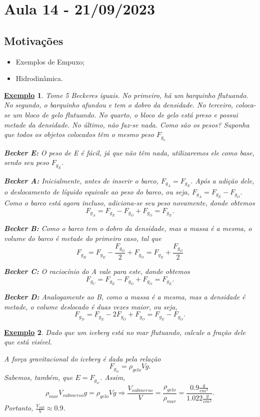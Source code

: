 \documentclass{article}
\newtheorem{example}{\underline{Exemplo}}
\begin{document}
\section{Aula 14 - 21/09/2023}
\subsection{Motivações}
\begin{itemize}
  \item Exemplos de Empuxo;
  \item Hidrodinâmica.
\end{itemize}
\begin{example}
  Tome 5 Beckeres iguais. No primeiro, há um barquinho flutuando. No segundo, o barquinho afundou e tem o dobro da densidade. No terceiro,
  coloca-se um bloco de gelo flutuando. No quarto, o bloco de gelo está preso e possui metade da densidade. No último, não faz-se nada. Como são os pesos?
  Suponha que todos os objetos colocados têm o mesmo peso \(F_{g_{o}}\)

  \textbf{Becker E:}
  O peso de E é fácil, já que não têm nada, utilizaremos ele como base, sendo seu peso \(F_{g_{E}}\).  

  \textbf{Becker A:}
  Inicialmente, antes de inserir o barco, \(F_{g_{A}} = F_{g_{E}}\). Após a adição dele, o deslocamento de líquido equivale ao peso do barco,
  ou seja, \(F_{g_{A}} = F_{g_{E}}-F_{g_{O}}.\) Como o barco está agora incluso, adiciona-se seu peso novamente, donde obtemos 
  \[
    F_{g_{A}} = F_{g_{E}} - F_{g_{O}} + F_{g_{O}} = F_{g_{E}}.
  \]

  \textbf{Becker B:}
  Como o barco tem o dobro da densidade, mas a massa é a mesma, o volume do barco é metade do primeiro caso, tal que 
  \[
    F_{g_{B}} = F_{g_{E}} - \frac{F_{g_{O}}}{2} + F_{g_{O}} = F_{g_{E}} + \frac{F_{g_{O}}}{2}
  \]

  \textbf{Becker C:}
  O raciocínio do A vale para este, donde obtemos 
  \[
    F_{g_{C}} = F_{g_{E}} - F_{g_{O}} + F_{g_{O}} = F_{g_{E}}.
  \]

  \textbf{Becker D:}
  Analogamente ao B, como a massa é a mesma, mas a densidade é metade, o volume deslocado é duas vezes maior, ou seja, 
  \[
    F_{g_{D}} = F_{g_{E}} - 2 F_{g_{O}} + F_{g_{O}} = F_{g_{E}} - F_{g_{O}}.
  \]
\end{example}
\begin{example}
  Dado que um iceberg está no mar flutuando, calcule a fração dele que está visível.

  A força gravitacional do iceberg é dada pela relação 
  \[
    F_{g_{ic}} = \rho_{gelo}Vg.
  \]
  Sabemos, também, que \(E = F_{g_{ic}}\). Assim, 
  \[
    \rho_{mar}V_{submerso}g = \rho_{gelo}Vg \Rightarrow \frac{V_{submerso}}{V} = \frac{\rho_{gelo}}{\rho_{mar}} = \frac{0.9\frac{g}{cm^{3}}}{1.022\frac{g}{cm^{3}}}.
  \]
  Portanto, \(\frac{V_{sub}}{V}\approx 0.9\).
\end{example}
\end{document}
